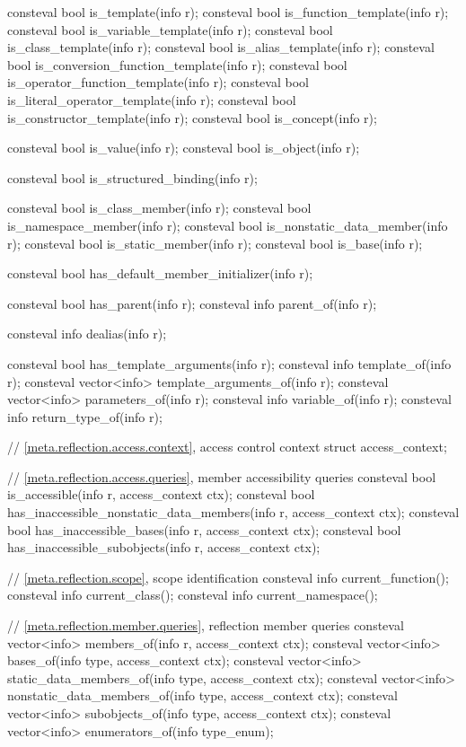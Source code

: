 \begin{codeblock}
{  consteval bool is_template(info r);
  consteval bool is_function_template(info r);
  consteval bool is_variable_template(info r);
  consteval bool is_class_template(info r);
  consteval bool is_alias_template(info r);
  consteval bool is_conversion_function_template(info r);
  consteval bool is_operator_function_template(info r);
  consteval bool is_literal_operator_template(info r);
  consteval bool is_constructor_template(info r);
  consteval bool is_concept(info r);

  consteval bool is_value(info r);
  consteval bool is_object(info r);

  consteval bool is_structured_binding(info r);

  consteval bool is_class_member(info r);
  consteval bool is_namespace_member(info r);
  consteval bool is_nonstatic_data_member(info r);
  consteval bool is_static_member(info r);
  consteval bool is_base(info r);

  consteval bool has_default_member_initializer(info r);

  consteval bool has_parent(info r);
  consteval info parent_of(info r);

  consteval info dealias(info r);

  consteval bool has_template_arguments(info r);
  consteval info template_of(info r);
  consteval vector<info> template_arguments_of(info r);
  consteval vector<info> parameters_of(info r);
  consteval info variable_of(info r);
  consteval info return_type_of(info r);

  // \ref{meta.reflection.access.context}, access control context
  struct access_context;

  // \ref{meta.reflection.access.queries}, member accessibility queries
  consteval bool is_accessible(info r, access_context ctx);
  consteval bool has_inaccessible_nonstatic_data_members(info r, access_context ctx);
  consteval bool has_inaccessible_bases(info r, access_context ctx);
  consteval bool has_inaccessible_subobjects(info r, access_context ctx);

  // \ref{meta.reflection.scope}, scope identification
  consteval info current_function();
  consteval info current_class();
  consteval info current_namespace();

  // \ref{meta.reflection.member.queries}, reflection member queries
  consteval vector<info> members_of(info r, access_context ctx);
  consteval vector<info> bases_of(info type, access_context ctx);
  consteval vector<info> static_data_members_of(info type, access_context ctx);
  consteval vector<info> nonstatic_data_members_of(info type, access_context ctx);
  consteval vector<info> subobjects_of(info type, access_context ctx);
  consteval vector<info> enumerators_of(info type_enum);

}
\end{codeblock}
